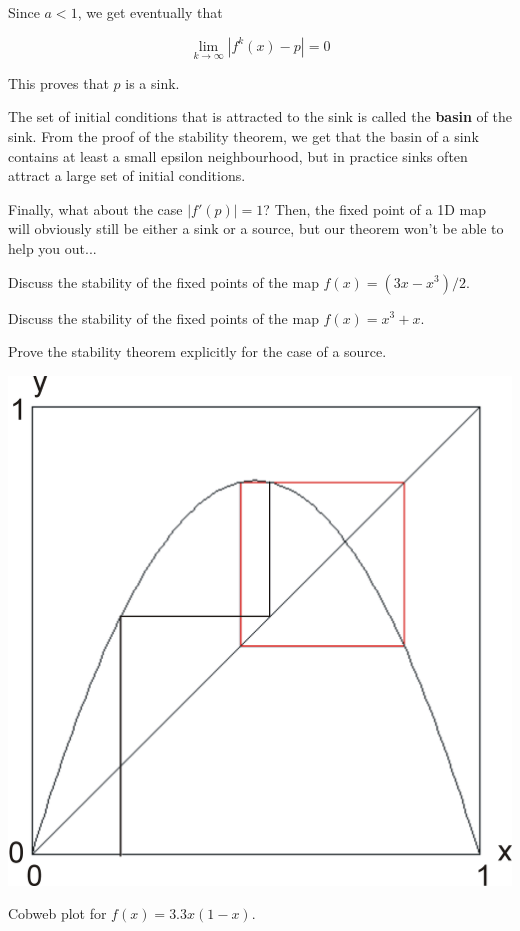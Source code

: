Since $a<1$, we get eventually that

\begin{equation}
\lim_{k \to \infty} \left|f^k(x)-p\right| = 0
\end{equation} 

This proves that $p$ is a sink.

The set of initial conditions that is attracted to the sink is called the \textbf{basin} of the sink. From the proof of the stability theorem, we get that the basin of a sink contains at least a small epsilon neighbourhood, but in practice sinks often attract a large set of initial conditions.

Finally, what about the case $|f'(p)|=1$? Then, the fixed point of a 1D map will obviously still be either a sink or a source, but our theorem won't be able to help you out...

\begin{exer}
Discuss the stability of the fixed points of the map $f(x) = (3x-x^3)/2$.
\end{exer}

\begin{exer}
Discuss the stability of the fixed points of the map $f(x) = x^3 + x$.
\end{exer}

\begin{exer}
Prove the stability theorem explicitly for the case of a source.
\end{exer}

\pagebreak


\begin{marginfigure}
\centering
\includegraphics{dynamic/figures/cobweb2}
\caption{Cobweb plot for $f(x)=3.3x(1-x)$.}
\label{fig-cobweb2}
\end{marginfigure}

